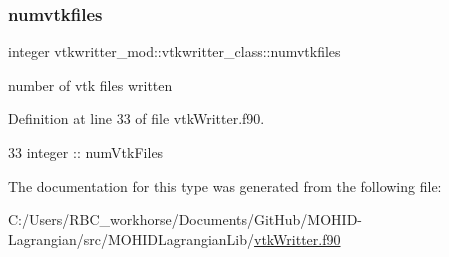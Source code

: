 \subsubsection{\texorpdfstring{numvtkfiles}{numvtkfiles}}
{\footnotesize\ttfamily integer vtkwritter\+\_\+mod\+::vtkwritter\+\_\+class\+::numvtkfiles\hspace{0.3cm}{\ttfamily [private]}}



number of vtk files written 



Definition at line 33 of file vtk\+Writter.\+f90.


\begin{DoxyCode}
33         \textcolor{keywordtype}{integer} :: numVtkFiles
\end{DoxyCode}


The documentation for this type was generated from the following file\+:\begin{DoxyCompactItemize}
\item 
C\+:/\+Users/\+R\+B\+C\+\_\+workhorse/\+Documents/\+Git\+Hub/\+M\+O\+H\+I\+D-\/\+Lagrangian/src/\+M\+O\+H\+I\+D\+Lagrangian\+Lib/\mbox{\hyperlink{vtk_writter_8f90}{vtk\+Writter.\+f90}}\end{DoxyCompactItemize}
